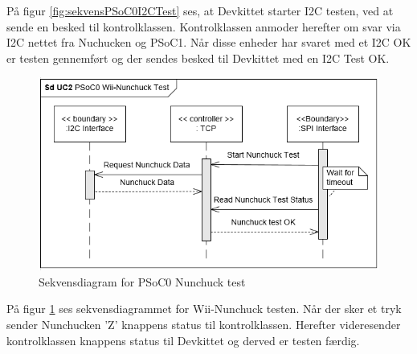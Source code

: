 På figur \ref{fig:sekvensPSoC0I2CTest} ses, at Devkittet starter I2C testen, ved at sende en besked til kontrolklassen. Kontrolklassen anmoder herefter om svar via I2C nettet fra Nuchucken og PSoC1. Når disse enheder har svaret med et I2C OK er testen gennemført og der sendes besked til Devkittet med en I2C Test OK.

\begin{figure}[H]
	\centering
	\includegraphics[width=\textwidth] {Systemarkitektur/images/SDPSoC0NunchuckTest}
	\caption{Sekvensdiagram for PSoC0 Nunchuck test}
	\label{fig:sekvensPSoC0NunchuckTest}
\end{figure}

På figur \ref{fig:sekvensPSoC0NunchuckTest} ses sekvensdiagrammet for Wii-Nunchuck testen. Når der sker et tryk sender Nunchucken 'Z' knappens status til kontrolklassen. Herefter videresender kontrolklassen knappens status til Devkittet og derved er testen færdig.\newline

